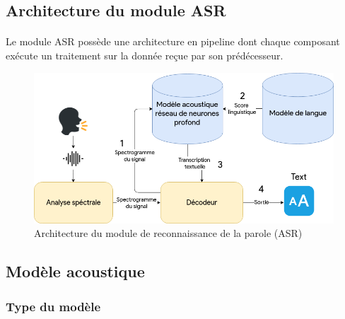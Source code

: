 	\subsection{Architecture du module ASR}
	\paragraph{}
	Le module ASR possède une architecture en pipeline dont chaque composant exécute un traitement sur la donnée reçue par son prédécesseur.
	\begin{figure}[H] 
		\centering
		\includegraphics[width=0.88\linewidth]{images/Conception/ASR/schema.png}
		\caption{Architecture du module de reconnaissance de la parole (ASR)}
	\end{figure}

	\subsection{Modèle acoustique}
		\subsubsection*{Type du modèle}
